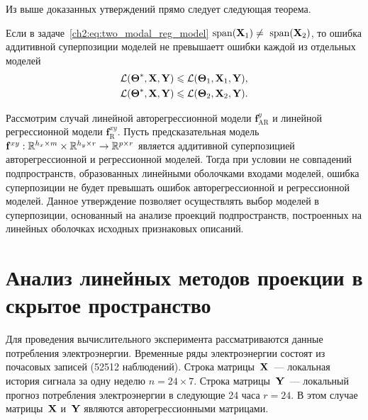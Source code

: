 Из выше доказанных утверждений прямо следует следующая теорема.

\begin{theorem}
	Если в задаче~\eqref{ch2:eq:two_modal_reg_model} $\text{span}(\mathbf{X}_1) \neq \text{ span}(\mathbf{X}_2)$, то ошибка аддитивной суперпозиции моделей не превышаетт ошибки каждой из отдельных моделей
	\begin{align*}
		\mathcal{L}(\boldsymbol{\Theta}^*, \mathbf{X}, \mathbf{Y}) &\leqslant \mathcal{L}(\boldsymbol{\Theta}_1, \mathbf{X}_1, \mathbf{Y}), \\
		\mathcal{L}(\boldsymbol{\Theta}^*, \mathbf{X}, \mathbf{Y}) &\leqslant \mathcal{L}(\boldsymbol{\Theta}_2, \mathbf{X}_2, \mathbf{Y}).
	\end{align*}
\end{theorem}

Рассмотрим случай линейной авторегрессионной модели $\mathbf{f}_{\text{AR}}^y$ и линейной регрессионной модели $\mathbf{f}_{\text{R}}^{xy}$. 
Пусть предсказательная модель $\mathbf{f}^{xy}: \mathbb{R}^{h_x \times m} \times \mathbb{R}^{h_y \times r} \rightarrow \mathbb{R}^{p \times r}$ является аддитивной суперпозицией авторегрессионной и регрессионной моделей.
Тогда при условии не совпадений подпространств, образованных линейными оболочками входами моделей, ошибка суперпозиции не будет превышать ошибок авторегрессионной и регрессионной моделей.
 Данное утверждение позволяет осуществлять выбор моделей в суперпозиции, основанный на анализе проекций подпространств, построенных на линейных оболочках исходных признаковых описаний.

\section{Анализ линейных методов проекции в скрытое пространство}
\label{sec:ch2:exp_linear}

Для проведения вычислительного эксперимента рассматриваются данные потребления электроэнергии.
Временные ряды электроэнергии состоят из почасовых записей (52512 наблюдений). 
Строка матрицы~$\mathbf{X}$~--– локальная история сигнала за одну неделю $n = 24 \times 7$. 
Строка матрицы~$\mathbf{Y}$~--- локальный прогноз потребления электроэнергии в следующие 24 часа $r = 24$. 
В этом случае матрицы~$\mathbf{X}$ и~$\mathbf{Y}$ являются авторегрессионными матрицами.

